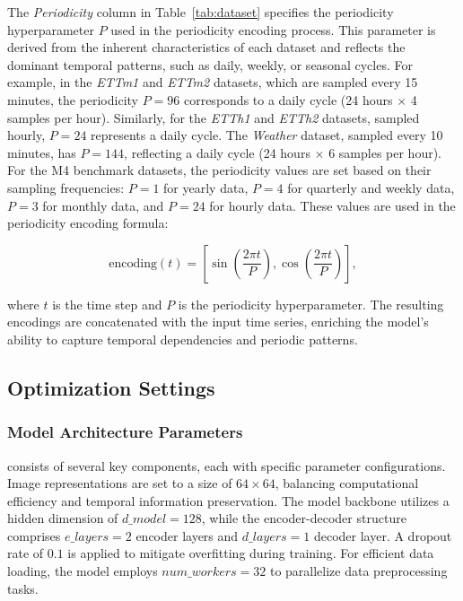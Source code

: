 The \textit{Periodicity} column in Table~\ref{tab:dataset} specifies the periodicity hyperparameter \( P \) used in the periodicity encoding process. This parameter is derived from the inherent characteristics of each dataset and reflects the dominant temporal patterns, such as daily, weekly, or seasonal cycles. For example, in the \textit{ETTm1} and \textit{ETTm2} datasets, which are sampled every 15 minutes, the periodicity \( P = 96 \) corresponds to a daily cycle (24 hours \(\times\) 4 samples per hour). Similarly, for the \textit{ETTh1} and \textit{ETTh2} datasets, sampled hourly, \( P = 24 \) represents a daily cycle. The \textit{Weather} dataset, sampled every 10 minutes, has \( P = 144 \), reflecting a daily cycle (24 hours \(\times\) 6 samples per hour). For the M4 benchmark datasets, the periodicity values are set based on their sampling frequencies: \( P = 1 \) for yearly data, \( P = 4 \) for quarterly and weekly data, \( P = 3 \) for monthly data, and \( P = 24 \) for hourly data. These values are used in the periodicity encoding formula:

\begin{equation}
    \text{encoding}(t) = \left[ \sin\left(\frac{2\pi t}{P}\right), \cos\left(\frac{2\pi t}{P}\right) \right],
\end{equation}

where \( t \) is the time step and \( P \) is the periodicity hyperparameter. The resulting encodings are concatenated with the input time series, enriching the model's ability to capture temporal dependencies and periodic patterns.

\subsection{Optimization Settings}
\label{appx:optimization_settings}

\subsubsection{Model Architecture Parameters}
\label{appx:model_parameters}

\method consists of several key components, each with specific parameter configurations. Image representations are set to a size of $64 \times 64$, balancing computational efficiency and temporal information preservation. The model backbone utilizes a hidden dimension of $d\_model = 128$, while the encoder-decoder structure comprises $e\_layers = 2$ encoder layers and $d\_layers = 1$ decoder layer. A dropout rate of $0.1$ is applied to mitigate overfitting during training. For efficient data loading, the model employs $num\_workers = 32$ to parallelize data preprocessing tasks.


